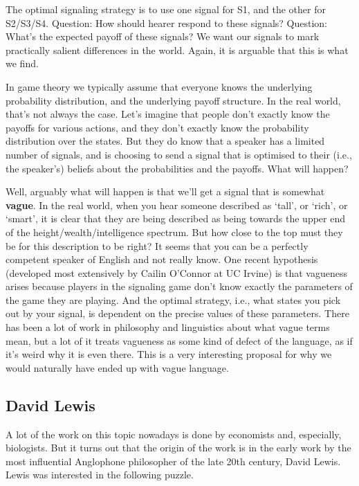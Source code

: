 \documentclass[
  11pt,
]{article}
\begin{document}
The optimal signaling strategy is to use one signal for S1, and the
other for S2/S3/S4. Question: How should hearer respond to these
signals? Question: What's the expected payoff of these signals? We want
our signals to mark practically salient differences in the world. Again,
it is arguable that this is what we find.

In game theory we typically assume that everyone knows the underlying
probability distribution, and the underlying payoff structure. In the
real world, that's not always the case. Let's imagine that people don't
exactly know the payoffs for various actions, and they don't exactly
know the probability distribution over the states. But they do know that
a speaker has a limited number of signals, and is choosing to send a
signal that is optimised to their (i.e., the speaker's) beliefs about
the probabilities and the payoffs. What will happen?

Well, arguably what will happen is that we'll get a signal that is
somewhat \textbf{vague}. In the real world, when you hear someone
described as `tall', or `rich', or `smart', it is clear that they are
being described as being towards the upper end of the
height/wealth/intelligence spectrum. But how close to the top must they
be for this description to be right? It seems that you can be a
perfectly competent speaker of English and not really know. One recent
hypothesis (developed most extensively by Cailin O'Connor at UC Irvine)
is that vagueness arises because players in the signaling game don't
know exactly the parameters of the game they are playing. And the
optimal strategy, i.e., what states you pick out by your signal, is
dependent on the precise values of these parameters. There has been a
lot of work in philosophy and linguistics about what vague terms mean,
but a lot of it treats vagueness as some kind of defect of the language,
as if it's weird why it is even there. This is a very interesting
proposal for why we would naturally have ended up with vague language.

\hypertarget{david-lewis}{%
\subsection{David Lewis}\label{david-lewis}}

A lot of the work on this topic nowadays is done by economists and,
especially, biologists. But it turns out that the origin of the work is
in the early work by the most influential Anglophone philosopher of the
late 20th century, David Lewis. Lewis was interested in the following
puzzle.
\end{document}
